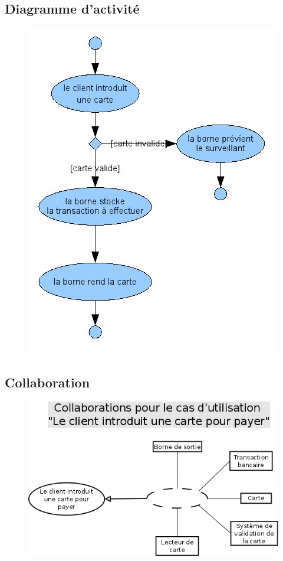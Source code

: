 \documentclass[a4paper]{article}
\begin{document}
\subsection{Diagramme d'activit\'e}
\begin{figure}[!ht]
\centering
\includegraphics[scale=.7]{imgs/act_cartepayer.jpg}
\end{figure}

\subsection{Collaboration}
\begin{figure}[!ht]
\centering
\includegraphics[scale=.5]{collaborations/_carte.png}
\end{figure}
\end{document}
